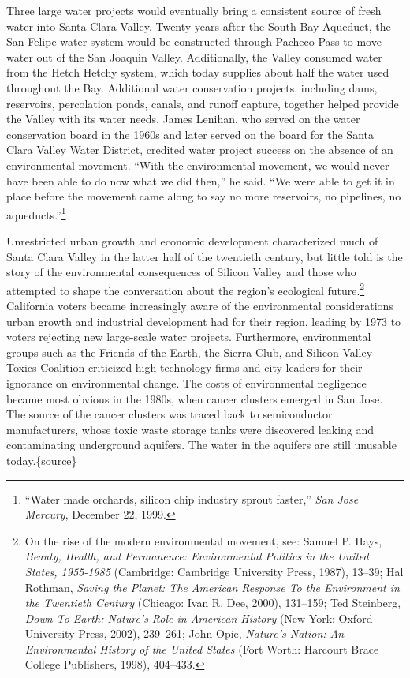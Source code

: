\documentclass[11pt,article,oneside]{memoir}
\begin{document}
Three large water projects would eventually bring a consistent source of
fresh water into Santa Clara Valley. Twenty years after the South Bay
Aqueduct, the San Felipe water system would be constructed through
Pacheco Pass to move water out of the San Joaquin Valley. Additionally,
the Valley consumed water from the Hetch Hetchy system, which today
supplies about half the water used throughout the Bay. Additional water
conservation projects, including dams, reservoirs, percolation ponds,
canals, and runoff capture, together helped provide the Valley with its
water needs. James Lenihan, who served on the water conservation board
in the 1960s and later served on the board for the Santa Clara Valley
Water District, credited water project success on the absence of an
environmental movement. ``With the environmental movement, we would
never have been able to do now what we did then,'' he said. ``We were
able to get it in place before the movement came along to say no more
reservoirs, no pipelines, no aqueducts.''\footnote{``Water made
  orchards, silicon chip industry sprout faster,'' \emph{San Jose
  Mercury}, December 22, 1999.}

Unrestricted urban growth and economic development characterized much of
Santa Clara Valley in the latter half of the twentieth century, but
little told is the story of the environmental consequences of Silicon
Valley and those who attempted to shape the conversation about the
region's ecological future.\footnote{On the rise of the modern
  environmental movement, see: Samuel P. Hays, \emph{Beauty, Health, and
  Permanence: Environmental Politics in the United States, 1955-1985}
  (Cambridge: Cambridge University Press, 1987), 13--39; Hal Rothman,
  \emph{Saving the Planet: The American Response To the Environment in
  the Twentieth Century} (Chicago: Ivan R. Dee, 2000), 131--159; Ted
  Steinberg, \emph{Down To Earth: Nature's Role in American History}
  (New York: Oxford University Press, 2002), 239--261; John Opie,
  \emph{Nature's Nation: An Environmental History of the United States}
  (Fort Worth: Harcourt Brace College Publishers, 1998), 404--433.}
California voters became increasingly aware of the environmental
considerations urban growth and industrial development had for their
region, leading by 1973 to voters rejecting new large-scale water
projects. Furthermore, environmental groups such as the Friends of the
Earth, the Sierra Club, and Silicon Valley Toxics Coalition criticized
high technology firms and city leaders for their ignorance on
environmental change. The costs of environmental negligence became most
obvious in the 1980s, when cancer clusters emerged in San Jose. The
source of the cancer clusters was traced back to semiconductor
manufacturers, whose toxic waste storage tanks were discovered leaking
and contaminating underground aquifers. The water in the aquifers are
still unusable today.\{source\}
\end{document}
